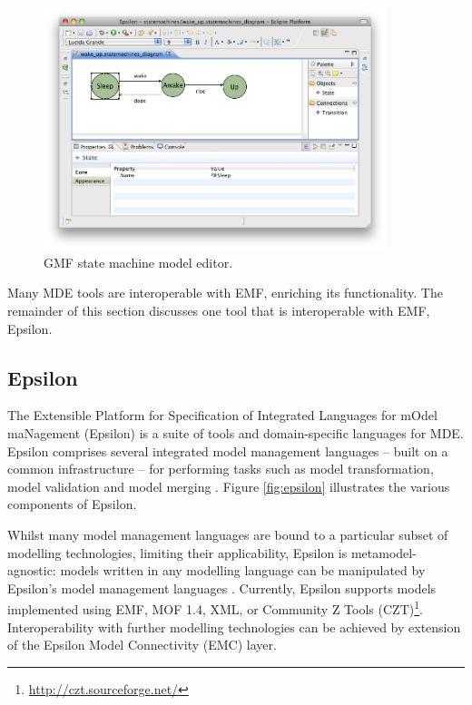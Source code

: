 \begin{figure}[htbp]
  \begin{center}
    \leavevmode
    \includegraphics[width=10cm]{2.Background/images/gmf_model_editor.png}
  \end{center}
  \caption{GMF state machine model editor.}
  \label{fig:gmf_model_editor}
\end{figure}

Many MDE tools are interoperable with EMF, enriching its functionality. The remainder of this section discusses one tool that is interoperable with EMF, Epsilon.

\subsection{Epsilon}
\label{subsec:epsilon}
The Extensible Platform for Specification of Integrated Languages for mOdel maNagement (Epsilon) \cite{kolovos09thesis} is a suite of tools and domain-specific languages for MDE. Epsilon comprises several integrated model management languages -- built on a common infrastructure -- for performing tasks such as model transformation, model validation and model merging \cite{kolovos09thesis}. Figure \ref{fig:epsilon} illustrates the various components of Epsilon.

Whilst many model management languages are bound to a particular subset of modelling technologies, limiting their applicability, Epsilon is metamodel-agnostic: models written in any modelling language can be manipulated by Epsilon's model management languages \cite{kolovos06eol}. Currently, Epsilon supports models implemented using EMF, MOF 1.4, XML, or Community Z Tools (CZT)\footnote{\url{http://czt.sourceforge.net/}}. Interoperability with further modelling technologies can be achieved by extension of the Epsilon Model Connectivity (EMC) layer. 

